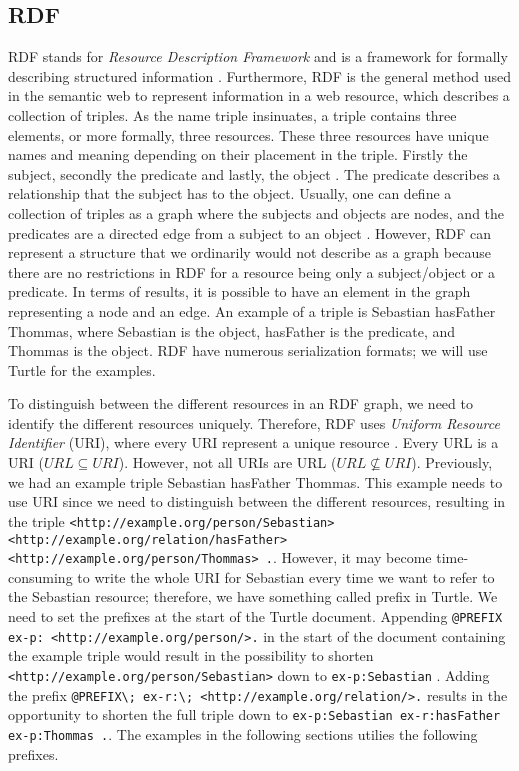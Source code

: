 \subsection{RDF}
\label{RDF}
RDF \autocite{W3C_RDF} stands for \emph{Resource Description Framework} and is a framework for formally describing structured information \autocite[19]{FOSWT}. Furthermore, RDF is the general method used in the semantic web to represent information in a web resource, which describes a collection of triples. As the name triple insinuates, a triple contains three elements, or more formally, three resources. These three resources have unique names and meaning depending on their placement in the triple. Firstly the subject, secondly the predicate and lastly, the object \autocite{W3C_RDF}. The predicate describes a relationship that the subject has to the object. Usually, one can define a collection of triples as a graph where the subjects and objects are nodes, and the predicates are a directed edge from a subject to an object \autocite{W3C_RDF}. However, RDF can represent a structure that we ordinarily would not describe as a graph because there are no restrictions in RDF for a resource being only a subject/object or a predicate. In terms of results, it is possible to have an element in the graph representing a node and an edge. An example of a triple is Sebastian hasFather Thommas, where Sebastian is the object, hasFather is the predicate, and Thommas is the object. RDF have numerous serialization formats; we will use Turtle \autocite{Turtle} for the examples.  

\para
To distinguish between the different resources in an RDF graph, we need to identify the different resources uniquely. Therefore, RDF uses \emph{Uniform Resource Identifier} (URI), where every URI represent a unique resource \autocite[21-22]{FOSWT}. Every URL is a URI ($URL\subseteq URI$). However, not all URIs are URL ($URL\nsubseteq URI$).  Previously, we had an example triple Sebastian hasFather Thommas. This example needs to use URI since we need to distinguish between the different resources, resulting in the triple \lstinline{<http://example.org/person/Sebastian> <http://example.org/relation/hasFather> <http://example.org/person/Thommas> .}. However, it may become time-consuming to write the whole URI for Sebastian every time we want to refer to the Sebastian resource; therefore, we have something called prefix in Turtle. We need to set the prefixes at the start of the Turtle document. Appending \lstinline{@PREFIX ex-p: <http://example.org/person/>.} in the start of the document containing the example triple would result in the possibility to shorten \lstinline{<http://example.org/person/Sebastian>} down to \lstinline{ex-p:Sebastian} . Adding the prefix \lstinline{@PREFIX\; ex-r:\; <http://example.org/relation/>.} results in the opportunity to shorten the full triple down to \lstinline{ex-p:Sebastian ex-r:hasFather ex-p:Thommas .}. The examples in the following sections utilies the following prefixes.

